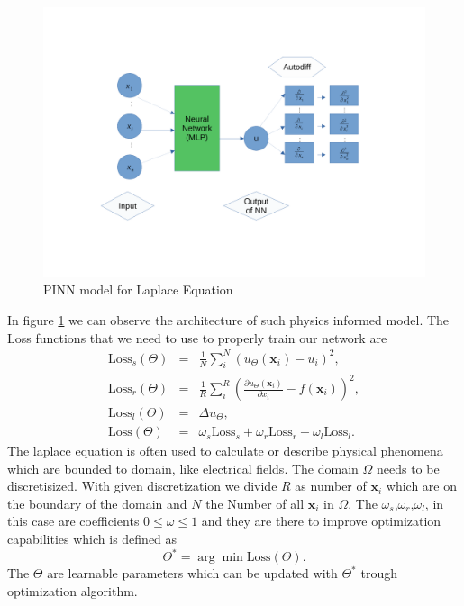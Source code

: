 \begin{figure}[h!]
	\includegraphics[width=15cm]{chapters/chapter1/pinn}
	\caption{PINN model for Laplace Equation}
	\label{a}
\end{figure}
In figure \ref{a} we can observe the architecture of such physics informed model. 
The Loss functions that we need to use to properly train our network are
\begin{eqnarray}
	\text{Loss}_s(\Theta) &=& \frac{1}{N}\sum^N_i\left(u_{\Theta}(\mathbf{x}_i)- u_i\right)^2,\\
	\text{Loss}_r(\Theta) &=& \frac{1}{R}\sum^R_i\left(\frac{\partial u_{\Theta}(\mathbf{x}_i)}{\partial x_i} - f(\mathbf{x}_i)\right)^2,\\
	\text{Loss}_l(\Theta) &=& \Delta u_{\Theta},\\
	\text{Loss}(\Theta) &=& \omega_s \text{Loss}_s +\omega_r \text{Loss}_r +\omega_l \text{Loss}_l .
\end{eqnarray}
The laplace equation is often used to calculate or describe physical phenomena which are bounded to domain, like electrical fields. The domain $\Omega$ needs to be discretisized.
With given discretization we divide $R$ as number of $\mathbf{x}_i$ which are on the boundary of the domain and $N$ the Number of all $\mathbf{x}_i$ in $\Omega$.
The $\omega_s$,$\omega_r$,$\omega_l$, in this case are coefficients $0\leq \omega \leq 1$ and they are there to improve optimization capabilities which is defined as
\begin{equation}
	\Theta^* = \arg\min\text{Loss}(\Theta).
\end{equation}
The $\Theta$ are learnable parameters which can be updated with $\Theta^*$ trough optimization algorithm.\\
